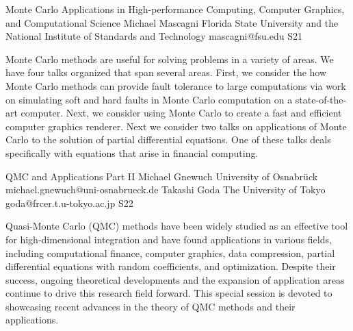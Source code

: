 

\clearpage

\begin{session}
 {Monte Carlo Applications in High-performance Computing, Computer Graphics, and Computational Science}%
 {Michael Mascagni}%
 {Florida State University and the National Institute of Standards and Technology}%
 {mascagni@fsu.edu}%
{}{}{}
 {S21}%
{}

 Monte Carlo methods are useful for solving problems in a variety of areas.  We have four talks organized that span several areas.  First, we consider the how Monte Carlo methods can provide fault tolerance to large computations via work on simulating soft and hard faults in Monte Carlo computation on a state-of-the-art computer.  Next, we consider using Monte Carlo to create a fast and efficient computer graphics renderer. Next we consider two talks on applications of Monte Carlo to the solution of partial differential equations.  One of these talks deals specifically with equations that arise in financial computing.
\end{session}



\clearpage

\begin{session}
 {QMC and Applications Part II}%
 {Michael Gnewuch}%
 {University of Osnabrück}%
 {michael.gnewuch@uni-osnabrueck.de}%
 {Takashi Goda}%
 {The University of Tokyo}%
 {goda@frcer.t.u-tokyo.ac.jp}%
 {S22}%
 {}%

 Quasi-Monte Carlo (QMC) methods have been widely studied as an effective tool for high-dimensional integration and have found applications in various fields, including computational finance, computer graphics, data compression, partial differential equations with random coefficients, and %
 optimization.
 Despite their success, ongoing theoretical developments and the expansion of application areas continue to drive this research field forward. This special session is devoted to showcasing recent advances in the theory of QMC methods and their applications.
\end{session}

